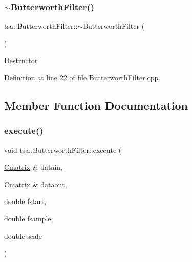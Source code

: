 \mbox{\label{classtsa_1_1_butterworth_filter_a085e8ea21b5fb0d564513bca234318df}} 
\subsubsection{\texorpdfstring{$\sim$\+Butterworth\+Filter()}{~ButterworthFilter()}}
{\footnotesize\ttfamily tsa\+::\+Butterworth\+Filter\+::$\sim$\+Butterworth\+Filter (\begin{DoxyParamCaption}{ }\end{DoxyParamCaption})\hspace{0.3cm}{\ttfamily [virtual]}}

Destructor 

Definition at line 22 of file Butterworth\+Filter.\+cpp.



\subsection{Member Function Documentation}
\mbox{\label{classtsa_1_1_butterworth_filter_a3e0223e447ec10bd00d488652abb702f}} 
\subsubsection{\texorpdfstring{execute()}{execute()}\hspace{0.1cm}{\footnotesize\ttfamily [1/2]}}
{\footnotesize\ttfamily void tsa\+::\+Butterworth\+Filter\+::execute (\begin{DoxyParamCaption}\item[{\hyperlink{namespacetsa_a86348fef1603a135fe5fba9e5f5486ee}{Cmatrix} \&}]{datain,  }\item[{\hyperlink{namespacetsa_a86348fef1603a135fe5fba9e5f5486ee}{Cmatrix} \&}]{dataout,  }\item[{double}]{fstart,  }\item[{double}]{fsample,  }\item[{double}]{scale }\end{DoxyParamCaption})}



